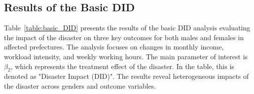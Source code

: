 \documentclass[a4paper,12pt]{article}
\begin{document}
\subsection{Results of the Basic DID}

Table~\ref{table:basic_DID} presents the results of the basic DID analysis evaluating the impact of the disaster on three key outcomes for both males and females in affected prefectures. The analysis focuses on changes in monthly income, workload intensity, and weekly working hours. The main parameter of interest is $\beta_2$, which represents the treatment effect of the disaster. In the table, this is denoted as "Disaster Impact (DID)". The results reveal heterogeneous impacts of the disaster across genders and outcome variables.


\end{document}
